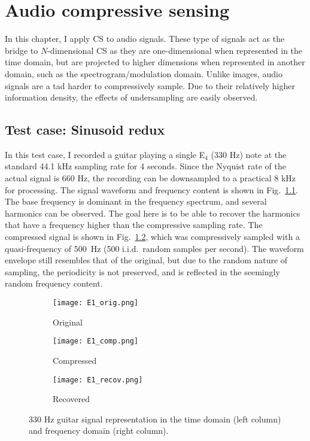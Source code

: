 \chapter{Audio compressive sensing}
\label{chap:nd-cs}
In this chapter, I apply CS to audio signals. These type of signals act as the bridge to $N$-dimensional CS as they are one-dimensional when represented in the time domain, but are projected to higher dimensions when represented in another domain, such as the spectrogram/modulation domain. Unlike images, audio signals are a tad harder to compressively sample. Due to their relatively higher information density, the effects of undersampling are easily observed.

\section{Test case: Sinusoid redux}
In this test case, I recorded a guitar playing a single E$_4$ (330 Hz) note at the standard 44.1 kHz sampling rate for 4 seconds. Since the Nyquist rate of the actual signal is 660 Hz, the recording can be downsampled to a practical 8 kHz for processing. The signal waveform and frequency content is shown in Fig.~\ref{fig:guitar-original}. The base frequency is dominant in the frequency spectrum, and several harmonics can be observed. The goal here is to be able to recover the harmonics that have a frequency higher than the compressive sampling rate. The compressed signal is shown in Fig.~\ref{fig:guitar-compressed}, which was compressively sampled with a quasi-frequency of 500~Hz (500 i.i.d.~random samples per second). The waveform envelope still resembles that of the original, but due to the random nature of sampling, the periodicity is not preserved, and is reflected in the seemingly random frequency content.

\begin{figure}[htb]
	\centering
	\begin{subfigure}{\textwidth}
		\centering
		\texttt{[image: E1\_orig.png]}
		\caption{Original}
		\label{fig:guitar-original}
	\end{subfigure}
	\begin{subfigure}{\textwidth}
		\centering
		\texttt{[image: E1\_comp.png]}
		\caption{Compressed}
		\label{fig:guitar-compressed}
	\end{subfigure}
	\begin{subfigure}{\textwidth}
		\centering
		\texttt{[image: E1\_recov.png]}
		\caption{Recovered}
		\label{fig:guitar-recovered}
	\end{subfigure}
	\caption{330 Hz guitar signal representation in the time domain (left column) and frequency domain (right column).}
	\label{fig:guitar}
\end{figure}